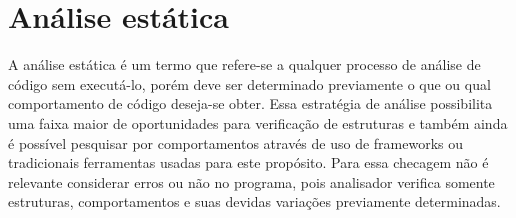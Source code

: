 \chapter{Análise estática}

A análise estática é um termo que refere-se a qualquer processo de análise de código sem executá-lo, porém deve ser determinado previamente o que ou qual comportamento de código deseja-se obter. Essa estratégia de análise possibilita uma faixa maior de oportunidades para verificação de estruturas e também ainda é possível pesquisar por comportamentos através de uso de frameworks ou tradicionais ferramentas usadas para este propósito. Para essa checagem não é relevante considerar erros ou não no programa, pois analisador verifica somente estruturas, comportamentos e suas devidas variações previamente determinadas.

